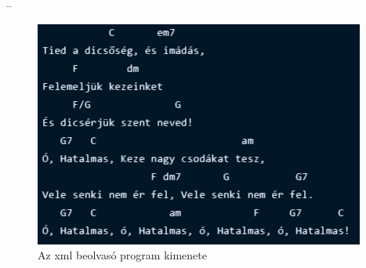 --

\begin{figure}[h]
	\includegraphics[scale=1]{images/output_tied.png}
	\caption{Az xml beolvasó program kimenete}
	\label{fig:output1}
\end{figure}